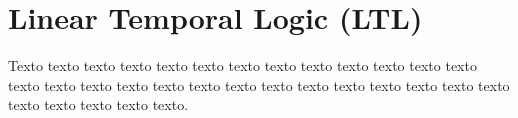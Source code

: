 \chapter{Linear Temporal Logic (LTL)}
\label{cap:ape}

Texto texto texto texto texto texto texto texto texto texto texto texto texto
texto texto texto texto texto texto texto texto texto texto texto texto texto
texto texto texto texto texto texto.

